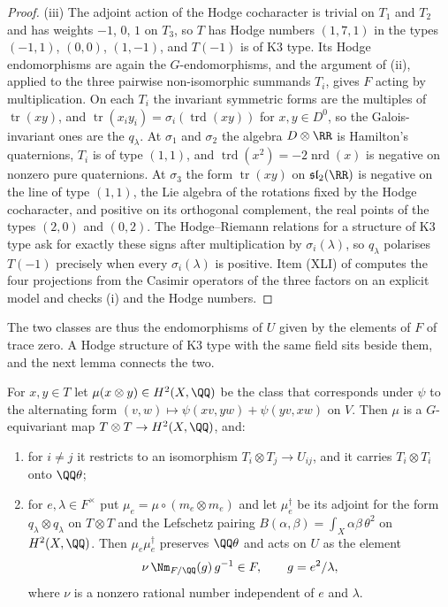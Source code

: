\begin{proof}
(iii) The adjoint action of the Hodge cocharacter is trivial on $T_{1}$ and
$T_{2}$ and has weights $-1$, $0$, $1$ on $T_{3}$, so $T$ has Hodge numbers
$(1,7,1)$ in the types $(-1,1)$, $(0,0)$, $(1,-1)$, and $T(-1)$ is of K3
type. Its Hodge endomorphisms are again the $G$-endomorphisms, and the
argument of (ii), applied to the three pairwise non-isomorphic summands
$T_{i}$, gives $F$ acting by multiplication. On each $T_{i}$ the invariant
symmetric forms are the multiples of $\operatorname{tr}(xy)$, and
$\operatorname{tr}(x_{i}y_{i})=\sigma_{i}(\operatorname{trd}(xy))$ for
$x,y\in D^{0}$, so the Galois-invariant ones are the $q_{\lambda}$. At
$\sigma_{1}$ and $\sigma_{2}$ the algebra $D\otimes\RR$ is Hamilton's
quaternions, $T_{i}$ is of type $(1,1)$, and $\operatorname{trd}(x^{2})=-2\operatorname{nrd}(x)$ is
negative on nonzero pure quaternions. At $\sigma_{3}$ the form
$\operatorname{tr}(xy)$ on $\mathfrak{sl}_{2}(\RR)$ is negative on the line of
type $(1,1)$, the Lie algebra of the rotations fixed by the Hodge
cocharacter, and positive on its orthogonal complement, the real points of
the types $(2,0)$ and $(0,2)$. The Hodge--Riemann relations for a structure
of K3 type ask for exactly these signs after multiplication by
$\sigma_{i}(\lambda)$, so $q_{\lambda}$ polarises $T(-1)$ precisely when every
$\sigma_{i}(\lambda)$ is positive. Item (XLI) of 
computes the four projections from the Casimir operators of the three factors
on an explicit model and checks (i) and the Hodge numbers.
\end{proof}

The two classes are thus the endomorphisms of $U$ given by the elements of
$F$ of trace zero. A Hodge structure of K3 type with the same field sits
beside them, and the next lemma connects the two.

\begin{lemma}\label{lem:mumfordmu}
For $x,y\in T$ let $\mu(x\otimes y)\in H^{2}(X,\QQ)$ be the class that
corresponds under $\psi$ to the alternating form
$(v,w)\mapsto\psi(xv,yw)+\psi(yv,xw)$ on $V$. Then $\mu$ is a $G$-equivariant
map $T\otimes T\to H^{2}(X,\QQ)$, and:
\begin{enumerate}[label=\textup{(\roman*)},nosep,leftmargin=2.6em]
\item for $i\ne j$ it restricts to an isomorphism $T_{i}\otimes T_{j}\to
  U_{ij}$, and it carries $T_{i}\otimes T_{i}$ onto $\QQ\theta$;
\item for $e,\lambda\in F^{\times}$ put $\mu_{e}=\mu\circ(m_{e}\otimes m_{e})$
  and let $\mu_{e}^{\dagger}$ be its adjoint for the form
  $q_{\lambda}\otimes q_{\lambda}$ on $T\otimes T$ and the Lefschetz pairing
  $B(\alpha,\beta)=\int_{X}\alpha\beta\,\theta^{2}$ on $H^{2}(X,\QQ)$. Then
  $\mu_{e}\mu_{e}^{\dagger}$ preserves $\QQ\theta$ and acts on $U$ as the
  element
  \[
    \nu\,\Nm_{F/\QQ}(g)\,g^{-1}\in F,\qquad g=e^{2}/\lambda,
  \]
  where $\nu$ is a nonzero rational number independent of $e$ and $\lambda$.
\end{enumerate}
\end{lemma}

